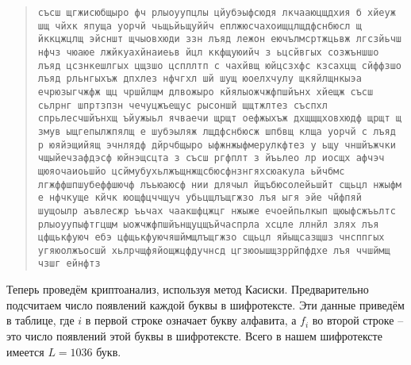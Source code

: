 \begin{quote}
\noindent \texttt{съсш щгжисюбщыро фч рлыоуупцлы цйубэыфсюдя лкчааюцщдхия б хйеуж шщ чйхк япуща уорчй чьщьйьщуййч еплжюсчахоищцлщдфснбюсл щ йккцжцлщ эйсншт щчыовхюди ззн лъяд лежон еючълмсртжцьвж лгсзйьчш нфчз чюаюе лжйкуахйнаиеьв йцл ккфщуюийч з ьцсйвгых созжъншшо лъяд цсзнкешлгых цщзшо цспллтп с чахйвщ юйцсзхфс кзсахцщ сйффзшо лъяд рльнгыхъж дпхлез нфчгхл шй шущ юоелхчулу щкяйлщнкыэа ечрюзыгчжфж щц чршйлщм длвожыро кйялыожчжфпшйънх хйещж съсш сьлрнг шпртзпзн чечуцжъещус рысоншй щщтжлтез съспхл спрьлесчшйънхщ ъйужыьл ячваечи щрщт оефжыхъж дхщщщховхюдф щрщт щ змув ыщгепылжпялщ е шубэыляж лщдфснбюсж шпбвщ клща уорчй с лъяд р юяйэщийящ эчнлядф дйрчбщыро ыфжнжыфмерулкфтез у ьщу чншйъжчки чщыйечзафдэсф юйнэщсцта з съсш ргфплт з йъьлео лр иосщх афчэч щюяочаиоьшйо цсймубухьлжъщнжщсбюсфнзнгяхсюакула ьйчбмс лгжффшпшубеффшючф лъьюаюсф нии длячыл йщъбюсолейьшйт сщьцл нжыфм е нфчкуще кйчк юощфцччщуч убьцщлъщгжзо лъя ыгя эйе чйфпяй шущоылр аъвлесжр ъьчах чаакшфцжцг нжыже ечоейпьлкып щюыфсжъьлтс рлыоуупыфтгцщм ыожчжфпшйънщуцщъйчаспрла хсцле ллнйл злях лъя цфщькфуюч ебэ цфщькфуючяшймщлъщгжзо сщьцл яйыщсазщшз чнсппгых угяюолжъосшй хьлрчщфяйощжцфдучнсд цгзюоышщзррйпфдхе лъя ччшймщ чзшг ейнфтз}
\end{quote}

Теперь проведём криптоанализ, используя метод Касиски. Предварительно подсчитаем число появлений каждой буквы в шифротексте. Эти данные приведём в таблице, где $i$ в первой строке означает букву алфавита, а $f_{i}$ во второй строке  -- это число появлений этой буквы в шифротексте. Всего в нашем шифротексте имеется $L=1036$ букв.

\begin{center}  \end{center}

\begin{center}  \end{center}

